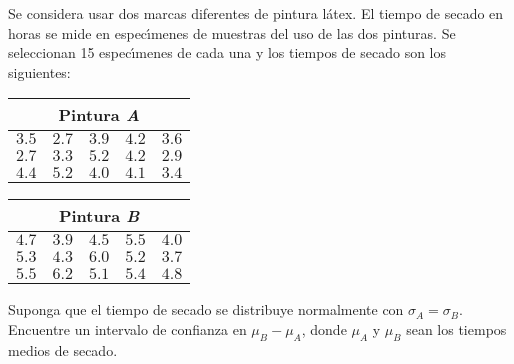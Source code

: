 \begin{enunciado}
 Se considera usar dos marcas diferentes de pintura l\'atex. El tiempo de secado en horas se mide en espec\'{\i}menes de muestras del uso de las dos pinturas. Se seleccionan 15 espec\'{\i}menes de cada una y los tiempos de secado son los siguientes:
 \begin{center}
  \begin{tabular}{ccccc}
   \multicolumn{5}{c}{\textbf{Pintura \textit{A}}} \\
   \hline
   $3.5$ & $2.7$ & $3.9$ & $4.2$ & $3.6$ \\
   $2.7$ & $3.3$ & $5.2$ & $4.2$ & $2.9$ \\
   $4.4$ & $5.2$ & $4.0$ & $4.1$ & $3.4$
  \end{tabular}
  \hspace{2cm}
  \begin{tabular}{ccccc}
   \multicolumn{5}{c}{\textbf{Pintura \textit{B}}} \\
   \hline 
   $4.7$ & $3.9$ & $4.5$ & $5.5$ & $4.0$ \\
   $5.3$ & $4.3$ & $6.0$ & $5.2$ & $3.7$ \\
   $5.5$ & $6.2$ & $5.1$ & $5.4$ & $4.8$
  \end{tabular}
 \end{center}
 Suponga que el tiempo de secado se distribuye normalmente con $\sigma_A = \sigma_B$. Encuentre un intervalo de confianza en $\mu_B - \mu_A$, donde $\mu_A$ y $\mu_B$ sean los tiempos medios de secado.
\end{enunciado}


